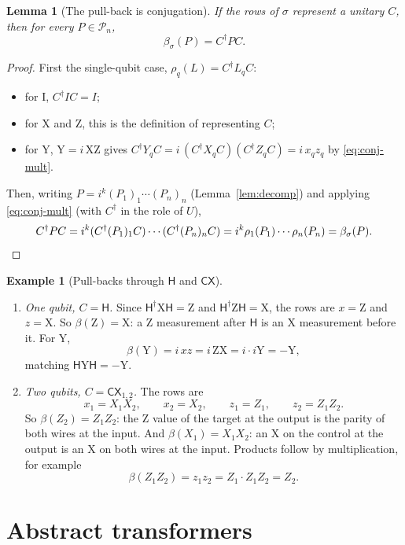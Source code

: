 \documentclass[11pt]{article}
\newtheorem{lemma}[theorem]{Lemma}
\theoremstyle{definition}
\newtheorem{example}[theorem]{Example}
\theoremstyle{remark}
\newcommand{\Pauli}{\mathcal{P}_n}
\newcommand{\adj}{^{\dagger}}
\newcommand{\back}{\beta}
\newcommand{\tI}{\mathrm{I}}
\newcommand{\tX}{\mathrm{X}}
\newcommand{\tY}{\mathrm{Y}}
\newcommand{\tZ}{\mathrm{Z}}
\newcommand{\gate}[1]{\mathsf{#1}}
\begin{document}
\begin{lemma}[The pull-back is conjugation]\label{lem:back}
If the rows of $\sigma$ represent a unitary $C$, then for every $P \in \Pauli$,
\[
  \back_\sigma(P) = C\adj P C .
\]
\end{lemma}

\begin{proof}
First the single-qubit case, $\rho_q(L) = C\adj L_q C$:
\begin{itemize}[nosep]
  \item for $\tI$, $C\adj I C = I$;
  \item for $\tX$ and $\tZ$, this is the definition of representing $C$;
  \item for $\tY$, $\tY = i\,\tX\tZ$ gives
  $C\adj Y_q C = i\,(C\adj X_q C)(C\adj Z_q C) = i\,x_q z_q$ by \eqref{eq:conj-mult}.
\end{itemize}
Then, writing $P = i^k (P_1)_1 \cdots (P_n)_n$ (Lemma~\ref{lem:decomp}) and applying
\eqref{eq:conj-mult} (with $C\adj$ in the role of $U$),
\[
  C\adj P C = i^k (C\adj (P_1)_1 C) \cdots (C\adj (P_n)_n C)
            = i^k \rho_1(P_1) \cdots \rho_n(P_n) = \back_\sigma(P). \qedhere
\]
\end{proof}

\begin{example}[Pull-backs through $\gate H$ and $\gate{CX}$]\label{ex:back}
\leavevmode
\begin{enumerate}[nosep]
  \item \emph{One qubit, $C = \gate H$.} Since $\gate H\adj \tX \gate H = \tZ$ and
  $\gate H\adj \tZ \gate H = \tX$, the rows are $x = \tZ$ and $z = \tX$. So
  $\back(\tZ) = \tX$: a $\tZ$ measurement after $\gate H$ is an $\tX$ measurement before it.
  For $\tY$,
  \[
    \back(\tY) = i\, x z = i\,\tZ\tX = i \cdot i\tY = -\tY ,
  \]
  matching $\gate H \tY \gate H = -\tY$.
  \item \emph{Two qubits, $C = \gate{CX}_{1,2}$.} The rows are
  \[
    x_1 = X_1X_2,\qquad x_2 = X_2,\qquad z_1 = Z_1,\qquad z_2 = Z_1Z_2 .
  \]
  So $\back(Z_2) = Z_1 Z_2$: the $\tZ$ value of the target at the output is the parity of
  both wires at the input. And $\back(X_1) = X_1X_2$: an $\tX$ on the control at the output
  is an $\tX$ on both wires at the input. Products follow by multiplication, for example
  \[
    \back(Z_1Z_2) = z_1 z_2 = Z_1 \cdot Z_1 Z_2 = Z_2 .
  \]
\end{enumerate}
\end{example}

\section{Abstract transformers}
\end{document}
